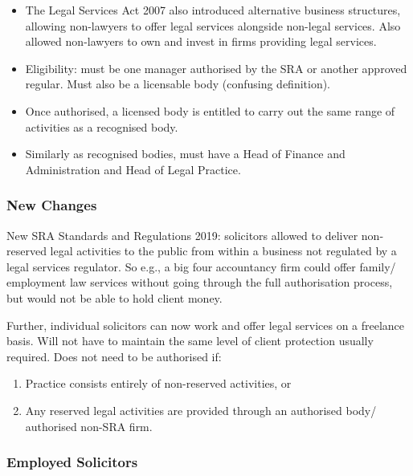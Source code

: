 \documentclass[
]{article}
\providecommand{\tightlist}{%
  \setlength{\itemsep}{0pt}\setlength{\parskip}{0pt}}
\begin{document}
\begin{itemize}
  \begin{itemize}
  \tightlist
  \item
    The Legal Services Act 2007 also introduced alternative business
    structures, allowing non-lawyers to offer legal services alongside
    non-legal services. Also allowed non-lawyers to own and invest in
    firms providing legal services.
  \item
    Eligibility: must be one manager authorised by the SRA or another
    approved regular. Must also be a licensable body (confusing
    definition).
  \item
    Once authorised, a licensed body is entitled to carry out the same
    range of activities as a recognised body.
  \item
    Similarly as recognised bodies, must have a Head of Finance and
    Administration and Head of Legal Practice.
  \end{itemize}
\end{itemize}

\hypertarget{new-changes}{%
\subsubsection{New Changes}\label{new-changes}}

New SRA Standards and Regulations 2019: solicitors allowed to deliver
non-reserved legal activities to the public from within a business not
regulated by a legal services regulator. So e.g., a big four accountancy
firm could offer family/ employment law services without going through
the full authorisation process, but would not be able to hold client
money.

Further, individual solicitors can now work and offer legal services on
a freelance basis. Will not have to maintain the same level of client
protection usually required. Does not need to be authorised if:

\begin{enumerate}
\def\labelenumi{\arabic{enumi}.}
\tightlist
\item
  Practice consists entirely of non-reserved activities, or
\item
  Any reserved legal activities are provided through an authorised body/
  authorised non-SRA firm.
\end{enumerate}

\hypertarget{employed-solicitors}{%
\subsubsection{Employed Solicitors}\label{employed-solicitors}}
\end{document}
